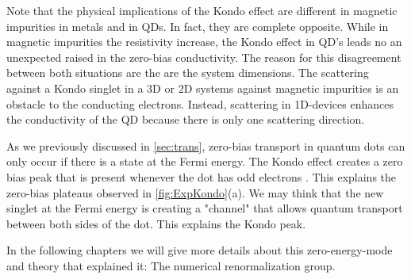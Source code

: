 Note that the physical implications of the Kondo effect  are different in magnetic impurities in metals and in QDs. In fact, they are complete opposite. While in magnetic impurities the resistivity increase, the Kondo effect in QD's leads no an unexpected raised in the zero-bias conductivity. The reason for this disagreement between both situations are the are the system dimensions. The scattering against a Kondo singlet in a  $3$D or $2$D systems against magnetic impurities is an obstacle to the conducting electrons. Instead, scattering in 1D-devices enhances the conductivity of the QD because there is only one scattering direction.

 As we previously discussed in \ref{sec:trans}, zero-bias transport in quantum dots can only occur if there is a state at the Fermi energy.  The Kondo effect creates a zero bias peak that is present whenever the dot has odd electrons . This explains the zero-bias plateaus observed in \ref{fig:ExpKondo}(a). We may think that the new singlet at the Fermi energy is creating a "channel" that allows quantum transport between both sides of the dot. This explains the Kondo peak. 

 In the following chapters we will give more details about this zero-energy-mode and theory that  explained it: The numerical renormalization group.  




















